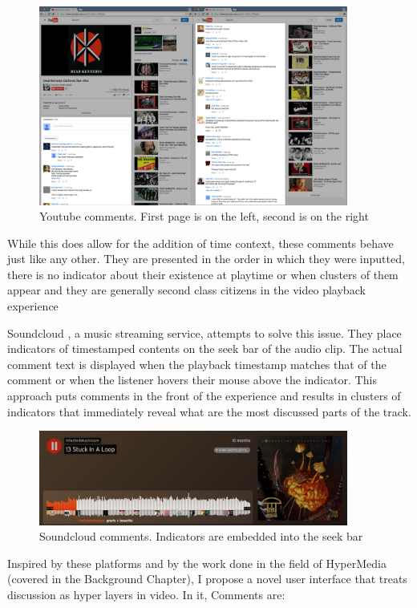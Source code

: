    \begin{figure}[thpb]
      \centering
      \includegraphics[width=4in]{figures/youtube-left.png}
      \caption{Youtube comments. First page is on the left, second is on the right}
      \label{fig_youtube_comments}
   \end{figure}

While this does allow for the addition of time context, these comments behave just like any other. They are presented in the order in which they were inputted, there is no indicator about their existence at playtime or when clusters of them appear and they are generally second class citizens in the video playback experience

Soundcloud \cite{soundcloud}, a music streaming service, attempts to solve this issue. They place indicators of timestamped contents on the seek bar of the audio clip. The actual comment text is displayed when the playback timestamp matches that of the comment or when the listener hovers their mouse above the indicator. This approach puts comments in the front of the experience and results in clusters of indicators that immediately reveal what are the most discussed parts of the track.

   \begin{figure}[thpb]
      \centering
      \includegraphics[width=4in]{figures/soundcloud.png}
      \caption{Soundcloud comments. Indicators are embedded into the seek bar}
      \label{fig_youtube_comments}
   \end{figure}

Inspired by these platforms and by the work done in the field of HyperMedia (covered in the Background Chapter), I propose a novel user interface that treats discussion as hyper layers in video. In it, Comments are: 

